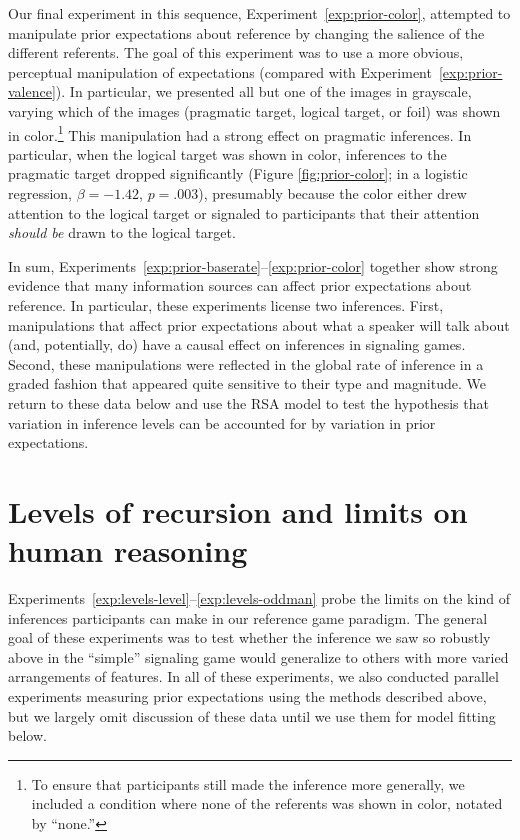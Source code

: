 \documentclass[man]{apa6}
\newcounter{Experiment}
\newcommand{\exptref}[1]{Experiment~\ref{#1}}
\newcommand{\exptrefrange}[2]{Experiments~\ref{#1}--\ref{#2}}
\begin{document}
Our final experiment in this sequence, \exptref{exp:prior-color}, attempted to manipulate prior expectations about reference by changing the salience of the different referents. The goal of this experiment was to use a more obvious, perceptual manipulation of expectations (compared with \exptref{exp:prior-valence}). In particular, we presented all but one of the images in grayscale, varying which of the images (pragmatic target, logical target, or foil) was shown in color.\footnote{To ensure that participants still made the inference more generally, we included a condition where none of the referents was shown in color, notated by ``none.''} This manipulation had a strong effect on pragmatic inferences. In particular, when the logical target was shown in color, inferences to the pragmatic target dropped significantly (Figure \ref{fig:prior-color}; in a logistic regression, $\beta = -1.42$, $p = .003$), presumably because the color either drew attention to the logical target or signaled to participants that their attention \emph{should be} drawn to the logical target.

In sum, \exptrefrange{exp:prior-baserate}{exp:prior-color} together show strong evidence that many information sources can affect prior expectations about reference. In particular, these experiments license two inferences. First, manipulations that affect prior expectations about what a speaker will talk about (and, potentially, do) have a causal effect on inferences in signaling games. Second, these manipulations were reflected in the global rate of inference in a graded fashion that appeared quite sensitive to their type and magnitude. We return to these data below and use the RSA model to test the hypothesis that variation in inference levels can be accounted for by variation in prior expectations.

\section{Levels of recursion and limits on human reasoning}
\label{sec:levels}

\exptrefrange{exp:levels-level}{exp:levels-oddman} probe the limits on the kind of inferences participants can make in our reference game paradigm. The general goal of these experiments was to test whether the inference we saw so robustly above in the ``simple'' signaling game would generalize to others with more varied arrangements of features. In all of these experiments, we also conducted parallel experiments measuring prior expectations using the methods described above, but we largely omit discussion of these data until we use them for model fitting below.
\end{document}
